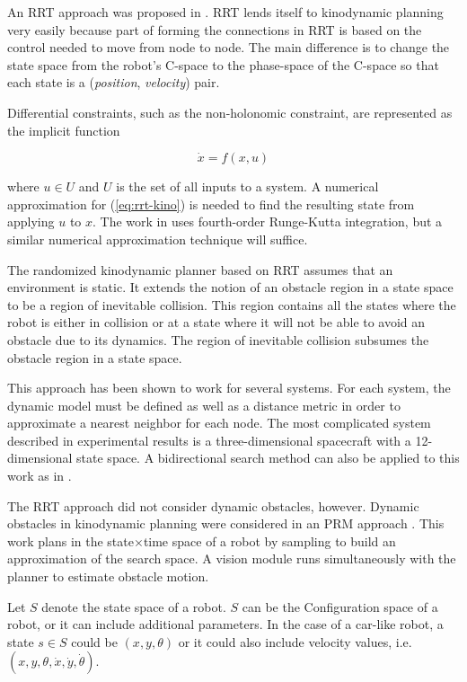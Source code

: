 An RRT approach was proposed in \cite{lavalle2001randomized}. RRT lends itself to kinodynamic planning very easily because part of forming the connections in RRT is based on the control needed to move from node to node. The main difference is to change the state space from the robot's C-space to the phase-space of the C-space so that each state is a (\emph{position}, \emph{velocity}) pair.

Differential constraints, such as the non-holonomic constraint, are represented as the implicit function

\begin{equation}
\label{eq:rrt-kino} \dot{x} = f(x,u)
\end{equation}

where $u \in U$ and $U$ is the set of all inputs to a system. A numerical approximation for (\ref{eq:rrt-kino}) is needed to find the resulting state from applying $u$ to $x$. The work in \cite{lavalle2001randomized} uses fourth-order Runge-Kutta integration, but a similar numerical approximation technique will suffice.

The randomized kinodynamic planner based on RRT assumes that an environment is static. It extends the notion of an obstacle region in a state space to be a region of inevitable collision. This region contains all the states where the robot is either in collision or at a state where it will not be able to avoid an obstacle due to its dynamics. The region of inevitable collision subsumes the obstacle region in a state space.

This approach has been shown to work for several systems. For each system, the dynamic model must be defined as well as a distance metric in order to approximate a nearest neighbor for each node. The most complicated system described in experimental results is a three-dimensional spacecraft with a 12-dimensional state space. A bidirectional search method can also be applied to this work as in \cite{kuffner2000rrt}.

The RRT approach did not consider dynamic obstacles, however. Dynamic obstacles in kinodynamic planning were considered in an PRM approach \cite{hsu2002randomized}. This work plans in the state$\times$time space of a robot by sampling to build an approximation of the search space. A vision module runs simultaneously with the planner to estimate obstacle motion.

Let $S$ denote the state space of a robot. $S$ can be the Configuration space of a robot, or it can include additional parameters. In the case of a car-like robot, a state $s \in S$ could be $(x,y,\theta)$ or it could also include velocity values, i.e. $(x,y,\theta,\dot{x},\dot{y},\dot{\theta})$. 

